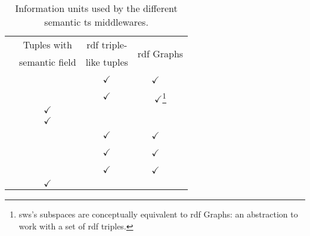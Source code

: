 
\begin{savenotes}
  \begin{table}[htbp]
    \caption{Information units used by the different semantic \ac{ts} middlewares.}
    \centering
    \begin{tabular}{ l c c c }
      \hline 
	& Tuples with & \ac{rdf} triple- & \multirow{2}{*}{\ac{rdf} Graphs} \\
	& semantic field & like tuples & \\
      \hline 
      \midtsc{} & & $\checkmark$ & $\checkmark$~~ \\ %
      \midsws{} & & $\checkmark$ & $\checkmark$\footnote{\ac{sws}'s subspaces are conceptually equivalent to \ac{rdf} Graphs: an abstraction to work with a set of \ac{rdf} triples.} \\
      \midstuples{} & $\checkmark$ & & \\
      \midcspaces{} & $\checkmark$ & & \\ %
      \midtscpp{} & & $\checkmark$ & $\checkmark$~~ \\
      \midtripcom{} & & $\checkmark$ & $\checkmark$~~ \\
      \midsmartmt{} & & $\checkmark$ & $\checkmark$~~ \\
      \midnardini{} & $\checkmark$ & & \\
      \hline 
    \end{tabular}
    \label{tab:tuple_comparison}
  \end{table}
\end{savenotes}